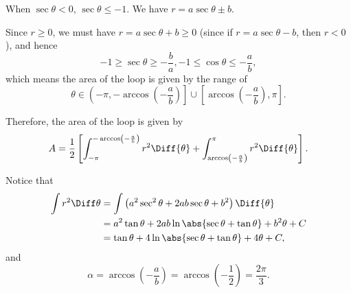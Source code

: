 \begin{enumerate}
          \begin{center}
              
          \end{center}

          When \(\sec \theta < 0\), \(\sec\theta \leq -1\). We have \(r = a \sec \theta \pm b\).

          Since \(r \geq 0\), we must have \(r = a \sec \theta + b \geq 0\) (since if \(r = a \sec \theta - b\), then \(r < 0\)), and hence
          \[
              -1 \geq \sec\theta  \geq -\frac{b}{a}, -1 \leq \cos\theta \leq -\frac{a}{b},
          \]
          which means the area of the loop is given by the range of
          \[
              \theta \in \left(-\pi, -\arccos\left(-\frac{a}{b}\right)\right] \cup \left[\arccos\left(-\frac{a}{b}\right), \pi\right].
          \]

          Therefore, the area of the loop is given by
          \[
              A = \frac{1}{2}\left[\int_{-\pi}^{-\arccos\left(-\frac{a}{b}\right)} r^2 \Diff{\theta} + \int_{\arccos\left(-\frac{a}{b}\right)}^{\pi} r^2 \Diff{\theta}\right].
          \]

          Notice that
          \begin{align*}
              \int r^2 \Diff \theta & = \int\left(a^2 \sec^2\theta + 2ab \sec\theta + b^2\right) \Diff{\theta} \\
                                    & = a^2 \tan\theta + 2ab \ln\abs{\sec\theta + \tan\theta} + b^2\theta + C  \\
                                    & = \tan\theta + 4\ln\abs{\sec\theta+\tan\theta} + 4\theta + C,
          \end{align*}
          and \[
              \alpha = \arccos\left(-\frac{a}{b}\right) = \arccos\left(-\frac{1}{2}\right) = \frac{2\pi}{3}.
          \]


\end{enumerate}
